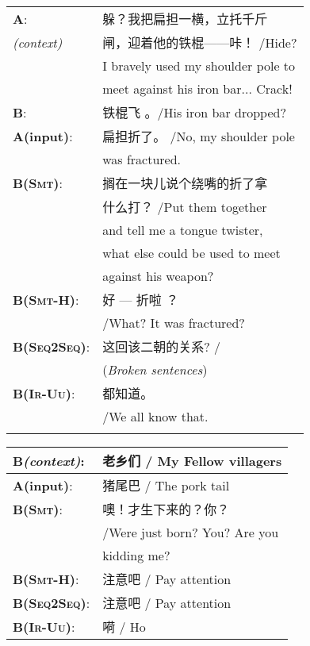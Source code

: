\documentclass[letterpaper]{article} %
\begin{document}
\begin{CJK*}{UTF8}{gbsn}
\noindent
\begin{tabular}{ll}
	\toprule
	\textbf{A}: & 躲？我把扁担一横，立托千斤\\
	\textit{(context)}& 闸，迎着他的铁棍——咔！ /Hide?\\
	& I bravely used my shoulder pole to\\
	& meet against his iron bar... Crack!  \\
	\textbf{B}: & 铁棍飞 。/His iron bar dropped?\\
	\midrule
	\textbf{A(input)}: & 扁担折了。  /No, my shoulder pole \\
	&  was fractured. \\
	\midrule
%
	\textbf{B(\textsc{Smt})}: & 搁在一块儿说个绕嘴的折了拿\\
	& 什么打？ /Put them together  \\
	& and tell me a tongue twister,  \\
	& what else could be used to meet \\
	& against his weapon?\\
	\textbf{B(\textsc{Smt-H})}: & 好 --- 折啦 ？ \\  %
	&  /What? It was fractured?\\
	\textbf{B(\textsc{Seq2Seq})}: & 这回该二朝的关系? /\\
	& (\textit{Broken sentences})\\
	\textbf{B(\textsc{Ir-Uu})}: & 都知道。\\
	& /We all know that.\\
	\bottomrule
	\\
\end{tabular}

\noindent
\begin{tabular}{ll}
	\toprule
	\textbf{B}\textit{(context)}: & 老乡们 / My Fellow villagers\\
	\midrule
	\textbf{A(input)}: & 猪尾巴 / The pork tail\\
	\midrule
	\textbf{B(\textsc{Smt})}: & 噢！才生下来的？你？\\
	& /Were just born? You? Are you \\
	& kidding me?\\
	\textbf{B(\textsc{Smt-H})}: & 注意吧 / Pay attention\\  %
	\textbf{B(\textsc{Seq2Seq})}: & 注意吧 / Pay attention\\ %
	\textbf{B(\textsc{Ir-Uu})}: & 嗬 / Ho\\
	\bottomrule
\end{tabular}


\end{CJK*}
\end{document}
